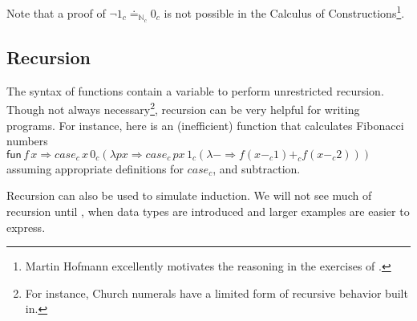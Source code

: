 
Note that a proof of $\lnot1_{c}\doteq_{\mathbb{N}_{c}}0_{c}$ is not possible in the Calculus of Constructions\cite{10.2307/2274575}\footnote{
  Martin Hofmann excellently motivates the reasoning in the exercises of \cite{hofmann_1997}.
}.

\subsection{Recursion}

The syntax of functions contain a variable to perform unrestricted recursion.
Though not always necessary\footnote{
  For instance, Church numerals have a limited form of recursive behavior built in.
}, recursion can be very helpful for writing programs.
For instance, here is an (inefficient) function that calculates Fibonacci numbers
$\mathsf{fun}\,f\,x\Rightarrow case_{c}\,x\,0_{c}\left(\lambda px\Rightarrow case_{c}\,px\,1_{c}\left(\lambda-\Rightarrow f\left(x-_{c}1\right)+_{c}f\left(x-_{c}2\right)\right)\right)$
assuming appropriate definitions for $case_{c}$, and subtraction.

Recursion can also be used to simulate induction. 
We will not see much of recursion until , when data types are introduced and larger examples are easier to express.
